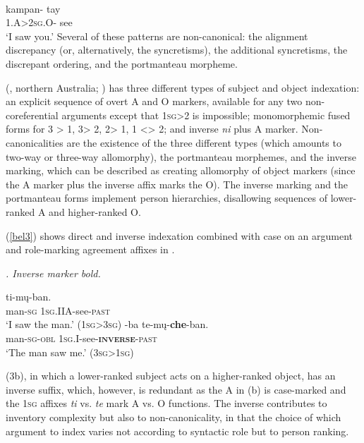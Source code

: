 \documentclass[output=paper,hidelinks]{langscibook}
\begin{document}
\ea \label{bel2} \\
	\gll kampan- tay\\
	1.A>2\textsc{sg}.O- see\\
	\glt ‘I saw you.’ 
\z
Several of these patterns are non-canonical: the alignment discrepancy (or, alternatively, the syncretisms), the additional syncretisms, the discrepant ordering, and the portmanteau morpheme.

 (, northern Australia; \citealt{Pensalfini2003}) has three different types of subject and object indexation: an explicit sequence of overt A and O markers, available for any two non-coreferential arguments except that 1\textsc{sg}>2 is impossible; monomorphemic fused forms for 3 > 1, 3> 2, 2> 1, 1 <> 2; and inverse \textit{ni} plus A marker.  Non-canonicalities are the existence of the three different types (which amounts to two-way or three-way allomorphy), the portmanteau morphemes, and the inverse marking, which can be described as creating allomorphy of object markers (since the A marker plus the inverse affix marks the O).  The inverse marking and the portmanteau forms implement person hierarchies, disallowing sequences of lower-ranked A and higher-ranked O.\largerpage[-1]

(\ref{bel3}) shows direct and inverse indexation combined with case on an argument and role-marking agreement affixes in . 

\ea \label{bel3} \emph{. Inverse marker bold.}
	\begin{xlist}
		\ex \gll {} ti-mų-ban.\\
		man-\textsc{sg} \textsc{1sg}.IIA-see-\textsc{past}\\
		\glt ‘I saw the man.’ (1\textsc{sg}>3\textsc{sg}) 
		\ex \gll {}-ba  	 te-mų-\textbf{che}-ban.\\
		man-\textsc{sg-obl} 1\textsc{sg}.I-see-\textsc{\textbf{inverse}-past}\\
		\glt ‘The man saw me.’ (3\textsc{sg}>1\textsc{sg}) 		
	\end{xlist}
 \z
{}

\noindent (3b), in which a lower-ranked subject acts on a higher-ranked object, has an inverse suffix, which, however, is redundant as the A in (b) is case-marked and the 1\textsc{sg} affixes \textit{ti} vs. \textit{te} mark A vs. O functions.  The inverse contributes to inventory complexity but also to non-canonicality, in that the choice of which argument to index varies not according to syntactic role but to person ranking.
\end{document}

